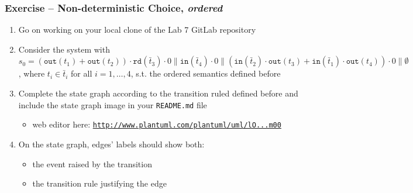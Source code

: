\documentclass[presentation]{beamer}\mode<presentation>{\usetheme{AMSCesenaPurpleAndGold}}
\newcommand{\labN}{7}
\begin{document}
\begin{frame}[allowframebreaks]
\frametitle{Exercise \currentExercise{} -- Non-deterministic Choice, \emph{ordered}}
    \begin{enumerate}
        \item Go on working on your local clone of the Lab \labN{} GitLab repository
        
        \vfill
        
        \item Consider the system with \alert{$s_0 = (\mathtt{out}(t_1) + \mathtt{out}(t_2)) \cdot \mathtt{rd}(\bar{t}_3) \cdot 0 \parallel \mathtt{in}(\bar{t}_4) \cdot 0 \parallel (\mathtt{in}(\bar{t}_2) \cdot \mathtt{out}(t_3) + \mathtt{in}(\bar{t}_1) \cdot \mathtt{out}(t_4)) \cdot 0  \parallel \emptyset$}, where $t_i \in \bar{t}_i$ for all $i = 1,\ldots,4$, s.t. the \alert{ordered} \linda{} semantics defined before
        
        \vfill
    
        \item Complete the state graph according to the transition ruled defined before and include the state graph image in your \alert{\texttt{README.md}} file
        \begin{itemize}
            \item web editor here: \href{
                http://www.plantuml.com/plantuml/uml/lO_1JW8n48RlVOeviXB8mf4GGbmnUj43yOGS6ZfYGxVTj5CLZGSg9ho8R-DJx9EuiDeWuQgtQV_ld_-VeIDkoUUAkONK1RSyXpEyurxHkT4qbiy8tNHF71Cdt4cqL0YIk98pTznznNE4p7WhqR9xAH0mBsW90jtCoeAaqMpFwRQh0LuOm2cVBURMU2qoeupjzqTQI3qV3C0e-O37Y1kDJqKreQYe9Ifb7jahOvEJARHQ0t0fs-slXXuqZAS6bM6LG1E-vv0aRIiQzBakmrlIJg7SV83KzSVwy2CaxTfNiyqehA8GFUNcdRcqRj7fGSo-rPFiuleo6rMFQIIwaGW7nCy17VXzRG_-flUsP0pj_bzeO4FKmkVg2m00
            }{\texttt{http://www.plantuml.com/plantuml/uml/lO...m00}}
        \end{itemize}
        
        \vfill
        
        \item On the state graph, edges' labels should show both:
        \begin{itemize}
            \item the event raised by the transition
            \item the transition rule justifying the edge
        \end{itemize}
        
        \vfill
        

\end{enumerate}
\end{frame}
\end{document}
